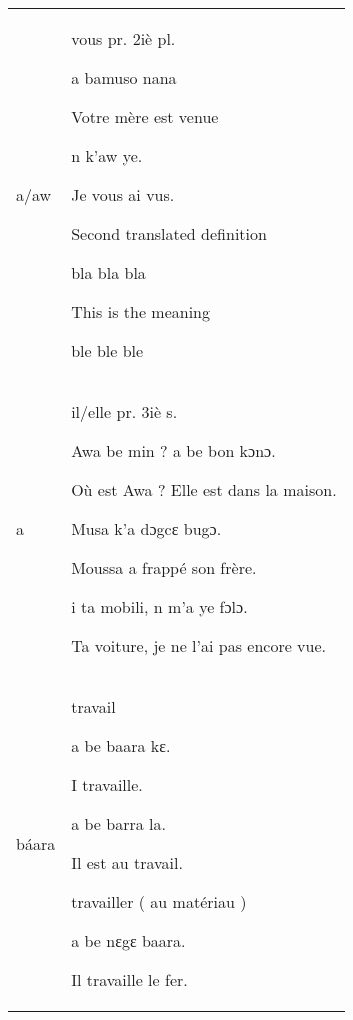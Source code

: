 \documentclass[a4paper,12pt]{article}
\begin{document}
\noindent
\begin{tabularx}{\textwidth}{@{} P{5cm} X @{}}
		a/aw &
\begin{definition}
	\item vous pr. 2iè pl.
		\begin{examples}
		\item a bamuso nana

		Votre mère est venue
		\item n k'aw ye.

	Je vous ai vus.
	\end{examples}
\item Second translated definition
	\begin{examples}
	\item bla bla bla

		This is the meaning
	\item ble ble ble
	\end{examples}
\end{definition}
\\
a &
\begin{definition}
\item il/elle pr. 3iè s.
	\begin{examples}
	\item Awa be min ? a be bon kɔnɔ.

		Où est Awa ? Elle est dans la maison.
	\item Musa k'a dɔgcɛ bugɔ.

		Moussa a frappé son frère.
	\item i ta mobili, n m'a ye fɔlɔ.

		Ta voiture, je ne l'ai pas encore vue.
	\end{examples}
\end{definition}
\\
báara &
\begin{definition}
\item travail
	\begin{examples}
	\item a be baara kɛ.

		I travaille.
	\item a be barra la.

		Il est au travail.
	\end{examples}
	\end{definition}
	\begin{definition}
	\item travailler ( au matériau )
		\begin{examples}
		\item a be nɛgɛ baara.

			Il travaille le fer.
		\end{examples}
	\end{definition}
\end{tabularx}
\end{document}
